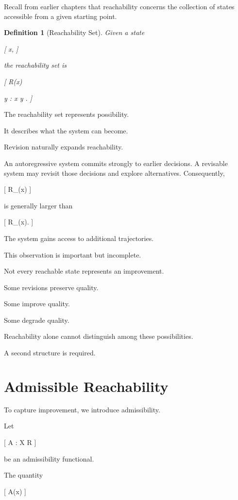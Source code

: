 \documentclass[11pt,oneside,openany]{book}
\newtheorem{definition}{Definition}[chapter] \newtheorem{theorem}{Theorem}[chapter] \newtheorem{proposition}{Proposition}[chapter] \newtheorem{lemma}{Lemma}[chapter] \newtheorem{corollary}{Corollary}[chapter] \newtheorem{remark}{Remark}[chapter]
\begin{document}
Recall from earlier chapters that reachability concerns the collection of states accessible from a given starting point.

\begin{definition}[Reachability Set]

Given a state

[
x,
]

the reachability set is

[
R(x)

{
y
:
x
\rightsquigarrow
y
}.
]

\end{definition}

The reachability set represents possibility.

It describes what the system can become.

Revision naturally expands reachability.

An autoregressive system commits strongly to earlier decisions. A revisable system may revisit those decisions and explore alternatives. Consequently,

[
R_{}(x)
]

is generally larger than

[
R_{}(x).
]

The system gains access to additional trajectories.

This observation is important but incomplete.

Not every reachable state represents an improvement.

Some revisions preserve quality.

Some improve quality.

Some degrade quality.

Reachability alone cannot distinguish among these possibilities.

A second structure is required.

\section{Admissible Reachability}

To capture improvement, we introduce admissibility.

Let

[
A
:
\mathcal X
\rightarrow
\mathbb R
]

be an admissibility functional.

The quantity

[
A(x)
]
\end{document}

